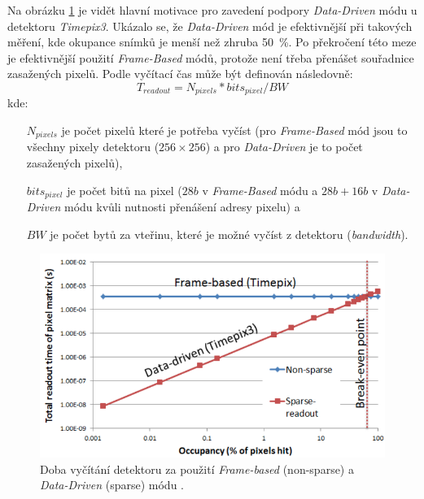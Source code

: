 Na obrázku \ref{fig:det:frame_vs_event_driven} je vidět hlavní motivace pro zavedení podpory \textit{Data-Driven} módu u detektoru \textit{Timepix3}. Ukázalo se, že \textit{Data-Driven} mód je efektivnější při takových měření, kde okupance snímků je menší než zhruba 50~\%. Po překročení této meze je efektivnější použití \textit{Frame-Based} módů, protože není třeba přenášet souřadnice zasažených pixelů. Podle \cite{timepix3} vyčítací čas může být definován následovně:
\begin{equation}\label{eq:det:readout_time}
	T_{readout} = N_{pixels}*bits_{pixel}/BW
\end{equation}
kde:
\begin{changemargin}{1.5cm}{1cm} 
	\begin{itemize}
		\item[$N_{pixels}$] je počet pixelů které je potřeba vyčíst (pro \textit{Frame-Based} mód jsou to všechny pixely detektoru ($256\times256$) a pro \textit{Data-Driven} je to počet zasažených pixelů),
		\item[$bits_{pixel}$] je počet bitů na pixel ($28 b$ v \textit{Frame-Based} módu a $28b + 16b$ v \textit{Data-Driven} módu kvůli nutnosti přenášení adresy pixelu) a
		\item[$BW$] je počet bytů za vteřinu, které je možné vyčíst z detektoru (\textit{bandwidth}). 
	\end{itemize}
\end{changemargin}

\begin{figure}[th]
	\begin{center}
		\includegraphics[width=14cm]{figures/det_frame_vs_event_driven.png}
		\caption{Doba vyčítání detektoru za použití \textit{Frame-based} (non-sparse) a \textit{Data-Driven} (sparse) módu \cite{timepix3}.}
		\label{fig:det:frame_vs_event_driven}
	\end{center}
\end{figure}

